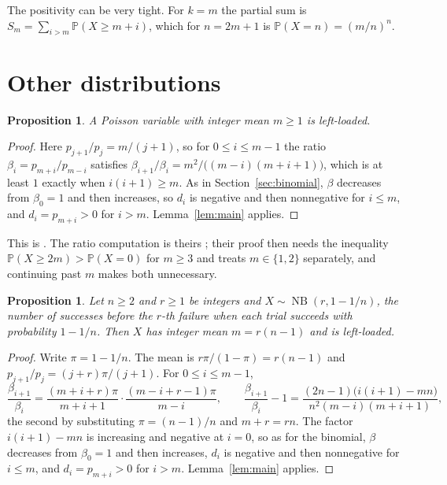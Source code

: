 \documentclass[11pt]{amsart}
\newtheorem{prop}[thm]{Proposition}
\theoremstyle{definition}
\theoremstyle{remark}
\DeclareMathOperator{\NB}{NB}
\newcommand{\Prob}{\mathbb P}
\begin{document}
The positivity can be very tight. For $k=m$ the partial sum is $S_m=\sum_{i>m}\Prob(X\ge m+i)$, which for $n=2m+1$ is
$\Prob(X=n)=(m/n)^n$.

\section{Other distributions}\label{sec:other}

\begin{prop}\label{prop:poisson}
A Poisson variable with integer mean $m\ge1$ is left-loaded.
\end{prop}

\begin{proof}
Here $p_{j+1}/p_j=m/(j+1)$, so for $0\le i\le m-1$ the ratio $\beta_i=p_{m+i}/p_{m-i}$ satisfies
$\beta_{i+1}/\beta_i=m^2/\bigl((m-i)(m+i+1)\bigr)$, which is at least $1$ exactly when $i(i+1)\ge m$. As in
Section~\ref{sec:binomial}, $\beta$ decreases from $\beta_0=1$ and then increases, so $d_i$ is negative and then
nonnegative for $i\le m$, and $d_i=p_{m+i}>0$ for $i>m$. Lemma~\ref{lem:main} applies.
\end{proof}

This is \cite[Lemma 3.7]{FPP}. The ratio computation is theirs \cite[Lemma~3.6]{FPP}; their proof then needs the
inequality $\Prob(X\ge2m)>\Prob(X=0)$ for $m\ge3$ \cite[Lemma~3.5]{FPP} and treats $m\in\{1,2\}$ separately,
and continuing past $m$ makes both unnecessary.

\begin{prop}\label{prop:nb}
Let $n\ge2$ and $r\ge1$ be integers and $X\sim\NB(r,1-1/n)$, the number of successes before the $r$-th failure when
each trial succeeds with probability $1-1/n$. Then $X$ has integer mean $m=r(n-1)$ and is left-loaded.
\end{prop}

\begin{proof}
Write $\pi=1-1/n$. The mean is $r\pi/(1-\pi)=r(n-1)$ and $p_{j+1}/p_j=(j+r)\pi/(j+1)$. For $0\le i\le m-1$,
\[
\frac{\beta_{i+1}}{\beta_i}=\frac{(m+i+r)\pi}{m+i+1}\cdot\frac{(m-i+r-1)\pi}{m-i},\qquad
\frac{\beta_{i+1}}{\beta_i}-1=\frac{(2n-1)\bigl(i(i+1)-mn\bigr)}{n^2(m-i)(m+i+1)},
\]
the second by substituting $\pi=(n-1)/n$ and $m+r=rn$. The factor $i(i+1)-mn$ is increasing and negative at $i=0$,
so as for the binomial, $\beta$ decreases from $\beta_0=1$ and then increases, $d_i$ is negative and then nonnegative
for $i\le m$, and $d_i=p_{m+i}>0$ for $i>m$. Lemma~\ref{lem:main} applies.
\end{proof}
\end{document}
